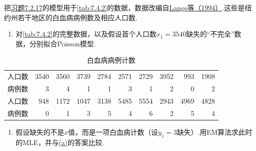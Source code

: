 \begin{exercise}\label{exercise:7.28}
把\hyperref[ex:7.2.17]{习题7.2.17}的模型用于\autoref{tab:7.4.2}的数据，数据改编自\hyperref[bib:source193]{Lange等（1994）}.这些是纽约州若干地区的白血病病例数及相应人口数.
\begin{enumerate}[label=(\alph*)]
\item{}\label{itm:exercise:7.28:a} 对\autoref{tab:7.4.2}的完整数据，以及假设首个人口数$x_1=3540$缺失的“不完全”数据，分别拟合Poisson模型.
\end{enumerate}
\setcounter{table}{1}
\begin{table}[H]
\centering\small
\caption{白血病病例计数}\label{tab:7.4.2}
\setlength{\tabcolsep}{3.2pt}
\begin{tabular}{lrrrrrrrrr}\hline
人口数&3540&3560&3739&2784&2571&2729&3952&993&1908\\
病例数&3&4&1&1&3&1&2&0&2\\\hline
人口数&948&1172&1047&3138&5485&5554&2943&4969&4828\\
病例数&0&1&3&5&4&6&2&5&4\\\hline
\end{tabular}
\end{table}
\begin{enumerate}[label=(\alph*),start=2]
\item 假设缺失的不是$x$值，而是一项白血病计数（设$y_1=3$缺失）.用EM算法求此时的MLE，并与\hyperref[itm:exercise:7.28:a]{(a)}的答案比较.
\end{enumerate}
\end{exercise}
